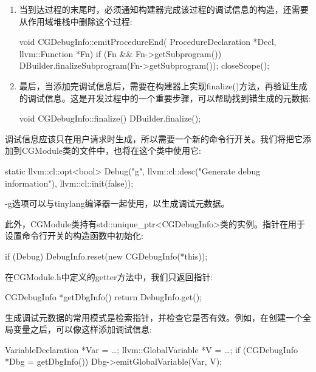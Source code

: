 \begin{enumerate}
\item
当到达过程的末尾时，必须通知构建器完成该过程的调试信息的构造，还需要从作用域堆栈中删除这个过程:

\begin{cpp}
void CGDebugInfo::emitProcedureEnd(
ProcedureDeclaration *Decl, llvm::Function *Fn) {
    if (Fn && Fn->getSubprogram())
        DBuilder.finalizeSubprogram(Fn->getSubprogram());
    closeScope();
}
\end{cpp}

\item
最后，当添加完调试信息后，需要在构建器上实现finalize()方法，再验证生成的调试信息。这是开发过程中的一个重要步骤，可以帮助找到错生成的元数据:

\begin{cpp}
void CGDebugInfo::finalize() { DBuilder.finalize(); }
\end{cpp}

\end{enumerate}

调试信息应该只在用户请求时生成，所以需要一个新的命令行开关。我们将把它添加到CGModule类的文件中，也将在这个类中使用它:

\begin{cpp}
static llvm::cl::opt<bool>
    Debug("g", llvm::cl::desc("Generate debug information"),
        llvm::cl::init(false));
\end{cpp}

-g选项可以与tinylang编译器一起使用，以生成调试元数据。

此外，CGModule类持有std::unique\_ptr<CGDebugInfo>类的实例。指针在用于设置命令行开关的构造函数中初始化:

\begin{cpp}
    if (Debug)
        DebugInfo.reset(new CGDebugInfo(*this));
\end{cpp}

在CGModule.h中定义的getter方法中，我们只返回指针:

\begin{cpp}
CGDebugInfo *getDbgInfo() {
    return DebugInfo.get();
}
\end{cpp}

生成调试元数据的常用模式是检索指针，并检查它是否有效。例如，在创建一个全局变量之后，可以像这样添加调试信息:

\begin{cpp}
VariableDeclaration *Var = …;
llvm::GlobalVariable *V = …;
if (CGDebugInfo *Dbg = getDbgInfo())
    Dbg->emitGlobalVariable(Var, V);
\end{cpp}

